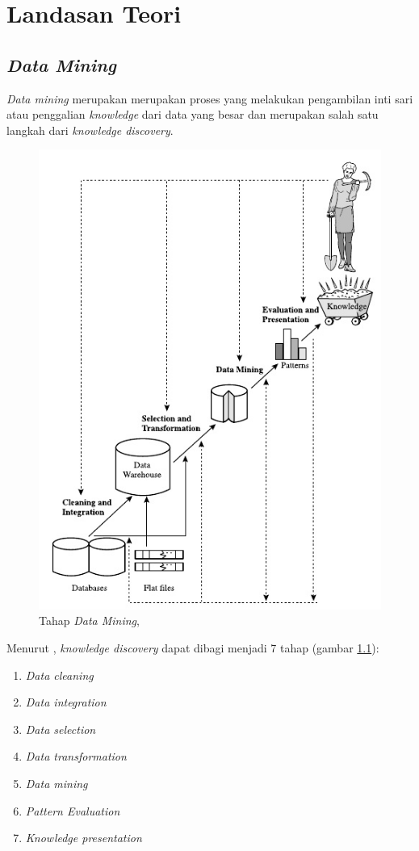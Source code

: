 \chapter{Landasan Teori}
\label{chap:definition}

\section{\textsl{Data Mining}}

\textsl{Data mining} merupakan merupakan proses yang melakukan pengambilan inti sari atau penggalian \textsl{knowledge} dari data yang besar dan merupakan salah satu langkah dari \textsl{knowledge discovery}.


\begin{figure}[H]
\includegraphics[scale=0.9]{Gambar/tahapdatamining.jpg}
\caption[Tahap \textsl{Data Mining}]{Tahap \textsl{Data Mining}, \cite{DM}} 
\label{fig:tahapDataMining}
\end{figure}

Menurut \cite{DM}, \textsl{knowledge discovery} dapat dibagi menjadi 7 tahap (gambar \ref{fig:tahapDataMining}):
\begin{enumerate}
	\item \textsl{Data cleaning}
	\item \textsl{Data integration}
	\item \textsl{Data selection}
	\item \textsl{Data transformation}
	\item \textsl {Data mining}
	\item \textsl{Pattern Evaluation}
	\item \textsl{Knowledge presentation}
\end{enumerate}


